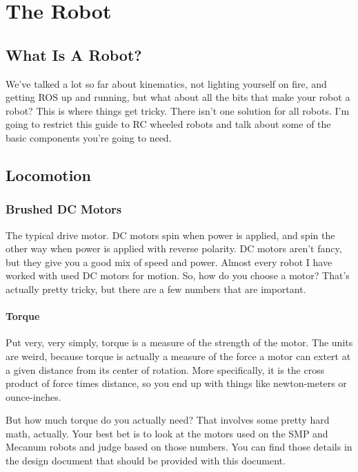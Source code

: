 
\chapter{The Robot}
\label{chap:therobot}

\section{What Is A Robot?}

We've talked a lot so far about kinematics, not lighting yourself on fire, and getting ROS up and running, but what about all the bits that make your robot a robot? This is where things get tricky. There isn't one solution for all robots. I'm going to restrict this guide to RC wheeled robots and talk about some of the basic components you're going to need.

\section{Locomotion}

\subsection{Brushed DC Motors}

The typical drive motor. DC motors spin when power is applied, and spin the other way when power is applied with reverse polarity. DC motors aren't fancy, but they give you a good mix of speed and power. Almost every robot I have worked with used DC motors for motion. So, how do you choose a motor? That's actually pretty tricky, but there are a few numbers that are important.

\subsubsection{Torque}

Put very, very simply, torque is a measure of the strength of the motor. The units are weird, because torque is actually a measure of the force a motor can extert at a given distance from its center of rotation. More specifically, it is the cross product of force times distance, so you end up with things like newton-meters or ounce-inches.

But how much torque do you actually need? That involves some pretty hard math, actually. Your best bet is to look at the motors used on the SMP and Mecanum robots and judge based on those numbers. You can find those details in the design document that should be provided with this document.

